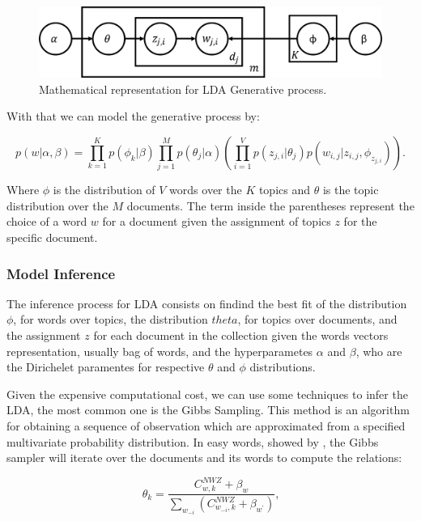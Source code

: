 	\begin{figure}[h!]
		\centering
		\includegraphics[width=0.7\linewidth]{01.Chapters/02.Background/generative-probs}
		\caption{Mathematical representation for LDA Generative process.}
		\label{fig:generative-probs}
	\end{figure}
	
	With that we can model the generative process by: 
	
	\begin{equation}
		\label{eq:generative-lda}
		p(w|\alpha, \beta) = \prod_{k=1}^{K} p(\phi_{k}|\beta) \prod_{j=1}^{M} p(\theta_{j}|\alpha) \left( \prod_{i=1}^{V}p(z_{j,i}|\theta_{j}) p(w_{i,j}|z_{i,j},\phi_{z_{j,i}})  \right) \text{.}
	\end{equation}

	Where $\phi$ is the distribution of $V$ words over the $K$ topics and $\theta$ is the topic distribution over the $M$ documents. The term inside the parentheses represent the choice of a word $w$ for a document given the assignment of topics $z$ for the specific document.
	
	\subsubsection{Model Inference}
	
	The inference process for LDA consists on findind the best fit of the distribution $\phi$, for words over topics, the distribution $theta$, for topics over documents, and the assignment $z$ for each document in the collection given the words vectors representation, usually bag of words, and the hyperparametes $\alpha$ and $\beta$, who are the Dirichelet paramentes for respective $\theta$ and $\phi$ distributions.
	
	Given the expensive computational cost, we can use some techniques to infer the LDA, the most common one is the Gibbs Sampling. This method is an algorithm for obtaining a sequence of observation which are approximated from a specified multivariate probability distribution. In easy words, showed by , the Gibbs sampler will iterate over the documents and its words to compute the relations:

	\begin{equation}
		\label{eq:theta-dist}
		\theta_{k} = \frac{C_{w,k}^{NWZ} + \beta_{w}} {\sum_{w_{-i}} \left(C_{w_{-i},k}^{NWZ} + \beta_{w^{'}} \right)} \text{,}
	\end{equation}
	
